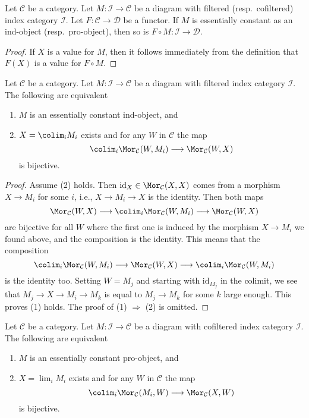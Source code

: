 \begin{lemma}
\label{lemma-image-essentially-constant}
Let $\mathcal{C}$ be a category. Let $M : \mathcal{I} \to \mathcal{C}$
be a diagram with filtered (resp.\ cofiltered) index category $\mathcal{I}$.
Let $F : \mathcal{C} \to \mathcal{D}$ be a functor.
If $M$ is essentially constant as an ind-object (resp.\ pro-object),
then so is $F \circ M : \mathcal{I} \to \mathcal{D}$.
\end{lemma}

\begin{proof}
If $X$ is a value for $M$, then it follows immediately from the
definition that $F(X)$ is a value for $F \circ M$.
\end{proof}

\begin{lemma}
\label{lemma-characterize-essentially-constant-ind}
Let $\mathcal{C}$ be a category. Let $M : \mathcal{I} \to \mathcal{C}$
be a diagram with filtered index category $\mathcal{I}$.
The following are equivalent
\begin{enumerate}
\item $M$ is an essentially constant ind-object, and
\item $X = \colim_i M_i$ exists and for any $W$ in $\mathcal{C}$
the map
$$
\colim_i \Mor_\mathcal{C}(W, M_i) \longrightarrow
\Mor_\mathcal{C}(W, X)
$$
is bijective.
\end{enumerate}
\end{lemma}

\begin{proof}
Assume (2) holds. Then $\text{id}_X \in \Mor_\mathcal{C}(X, X)$
comes from a morphism $X \to M_i$ for some $i$, i.e., $X \to M_i \to X$
is the identity. Then both maps
$$
\Mor_\mathcal{C}(W, X)
\longrightarrow
\colim_i \Mor_\mathcal{C}(W, M_i)
\longrightarrow
\Mor_\mathcal{C}(W, X)
$$
are bijective for all $W$ where the first one is induced by the morphism
$X \to M_i$ we found above, and the composition is the identity. This means
that the composition
$$
\colim_i \Mor_\mathcal{C}(W, M_i)
\longrightarrow
\Mor_\mathcal{C}(W, X)
\longrightarrow
\colim_i \Mor_\mathcal{C}(W, M_i)
$$
is the identity too. Setting $W = M_j$ and starting with $\text{id}_{M_j}$
in the colimit, we see that $M_j \to X \to M_i \to M_k$ is equal to
$M_j \to M_k$ for some $k$ large enough. This proves (1) holds.
The proof of (1) $\Rightarrow$ (2) is omitted.
\end{proof}

\begin{lemma}
\label{lemma-characterize-essentially-constant-pro}
Let $\mathcal{C}$ be a category. Let $M : \mathcal{I} \to \mathcal{C}$
be a diagram with cofiltered index category $\mathcal{I}$.
The following are equivalent
\begin{enumerate}
\item $M$ is an essentially constant pro-object, and
\item $X = \lim_i M_i$ exists and for any $W$ in $\mathcal{C}$
the map
$$
\colim_i \Mor_\mathcal{C}(M_i, W)
\longrightarrow
\Mor_\mathcal{C}(X, W)
$$
is bijective.
\end{enumerate}
\end{lemma}

